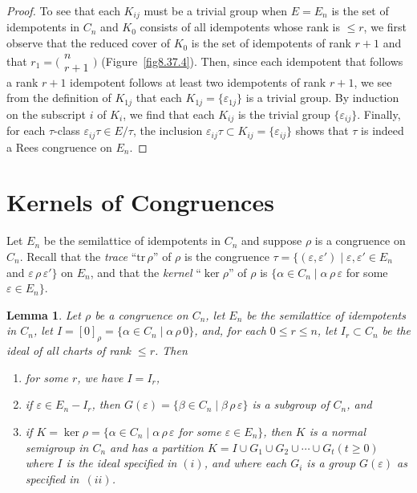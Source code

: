 \documentclass{surv-l}
\numberwithin{equation}{section}
\numberwithin{table}{section}
\numberwithin{figure}{section}
\newtheorem{lemma}[equation]{Lemma}
\theoremstyle{definition}
\begin{document}
\begin{proof}
To see that each $K_{ij}$ must be a trivial group when $E=E_{n}$
is the set of idempotents in $C_{n}$ and $K_{0}$ consists of all
idempotents whose rank is $\leq r$, we first observe that the
reduced cover of $K_{0}$ is the set of idempotents of rank $r+1$
and that $r_{1}=\big(\!\begin{smallmatrix}
n\\
r+1\end{smallmatrix}\!\big)$ (Figure~\ref{fig8.37.4}). Then, since
each idempotent that follows a rank $r+1$ idempotent follows at
least two idempotents of rank $r+1$, we see from the definition of
$K_{1j}$ that each $K_{1j}=\{\varepsilon_{1j}\}$ is a trivial
group. By induction on the subscript $i$ of $K_{i}$, we find that
each $K_{ij}$ is the trivial group $\{\varepsilon_{ij}\}$.
Finally, for each $\tau$-class $\varepsilon_{ij}\tau\in E/\tau$,
the inclusion $\varepsilon_{ij}\tau\subset
K_{ij}=\{\varepsilon_{ij}\}$ shows that $\tau$ is indeed a Rees
congruence on $E_{n}.$
\end{proof}

\section{Kernels of Congruences}\label{sec8.38}

Let $E_{n}$ be the semilattice of idempotents in $C_{n}$ and
suppose $\rho$ is a congruence on $C_{n}$. Recall that the
\emph{trace} ``$\mathrm{tr}\,\rho$'' of $\rho$ is the congruence
$\tau= \{ (\varepsilon, \varepsilon') \mid \varepsilon,
\varepsilon'\in E_{n}$ and $\varepsilon\, \rho\,\varepsilon'\}$ on
$E_{n}$, and that the \emph{kernel} ``$\ker \rho$'' of
$\rho$ is $\{\alpha\in C_{n}\mid \alpha\,\rho\,\varepsilon$ for
some $\varepsilon \in E_{n}\}$.

\begin{lemma}\label{8.38.1}
Let $\rho$ be a congruence on $C_{n}$, let $E_{n}$ be the
semilattice of idempotents in $C_{n}$, let $I
=[0]_{\rho}=\{\alpha\in C_{n}\mid \alpha\,\rho\,0\}$, and, for
each $0\leq r\leq n$, let $I_{r}\subset C_{n}$ be the ideal of all
charts of rank $\leq r$. Then
\begin{enumerate}
\item[(\emph{i})] for some $r$, we have $I =I_{r}$,

\item[(ii)] if $\varepsilon\in E_{n}-I_{r}$, then
$G(\varepsilon)=\{\beta\in
C_{n}\mid \beta\,\rho\,\varepsilon\}$ is a subgroup of $C_{n}$,
and

\item[(\emph{iii})] if $K=\ker \rho=\{\alpha\in
C_{n}\mid \alpha\,\rho\,\varepsilon$ for some $\varepsilon\in
E_{n}\}$, then $K$ is a normal semigroup in $C_{n}$ and has a
partition $K=I\cup G_{1}\cup G_{2}\cup\cdots\cup G_{t}(t\geq
0)$ where $I$ is the ideal specified in $(i)$, and where each
$G_{i}$ is a group $G(\varepsilon)$ as specified in~$(ii)$.
\end{enumerate}
\end{lemma}
\end{document}
